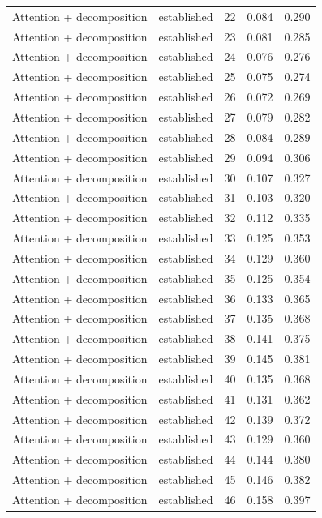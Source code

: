 \begin{tabular}{llrrr}
Attention + decomposition & established & 22 & 0.084 & 0.290 \\
Attention + decomposition & established & 23 & 0.081 & 0.285 \\
Attention + decomposition & established & 24 & 0.076 & 0.276 \\
Attention + decomposition & established & 25 & 0.075 & 0.274 \\
Attention + decomposition & established & 26 & 0.072 & 0.269 \\
Attention + decomposition & established & 27 & 0.079 & 0.282 \\
Attention + decomposition & established & 28 & 0.084 & 0.289 \\
Attention + decomposition & established & 29 & 0.094 & 0.306 \\
Attention + decomposition & established & 30 & 0.107 & 0.327 \\
Attention + decomposition & established & 31 & 0.103 & 0.320 \\
Attention + decomposition & established & 32 & 0.112 & 0.335 \\
Attention + decomposition & established & 33 & 0.125 & 0.353 \\
Attention + decomposition & established & 34 & 0.129 & 0.360 \\
Attention + decomposition & established & 35 & 0.125 & 0.354 \\
Attention + decomposition & established & 36 & 0.133 & 0.365 \\
Attention + decomposition & established & 37 & 0.135 & 0.368 \\
Attention + decomposition & established & 38 & 0.141 & 0.375 \\
Attention + decomposition & established & 39 & 0.145 & 0.381 \\
Attention + decomposition & established & 40 & 0.135 & 0.368 \\
Attention + decomposition & established & 41 & 0.131 & 0.362 \\
Attention + decomposition & established & 42 & 0.139 & 0.372 \\
Attention + decomposition & established & 43 & 0.129 & 0.360 \\
Attention + decomposition & established & 44 & 0.144 & 0.380 \\
Attention + decomposition & established & 45 & 0.146 & 0.382 \\
Attention + decomposition & established & 46 & 0.158 & 0.397 \\

\end{tabular}
